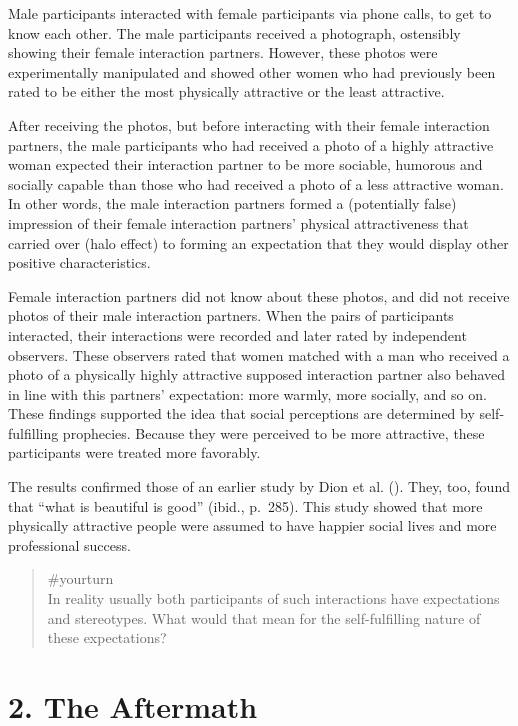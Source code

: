 \documentclass[
  letterpaper,
]{book}
\begin{document}
Male participants interacted with female participants via phone calls,
to get to know each other. The male participants received a photograph,
ostensibly showing their female interaction partners. However, these
photos were experimentally manipulated and showed other women who had
previously been rated to be either the most physically attractive or the
least attractive.

After receiving the photos, but before interacting with their female
interaction partners, the male participants who had received a photo of
a highly attractive woman expected their interaction partner to be more
sociable, humorous and socially capable than those who had received a
photo of a less attractive woman. In other words, the male interaction
partners formed a (potentially false) impression of their female
interaction partners' physical attractiveness that carried over (halo
effect) to forming an expectation that they would display other positive
characteristics.

Female interaction partners did not know about these photos, and did not
receive photos of their male interaction partners. When the pairs of
participants interacted, their interactions were recorded and later
rated by independent observers. These observers rated that women matched
with a man who received a photo of a physically highly attractive
supposed interaction partner also behaved in line with this partners'
expectation: more warmly, more socially, and so on. These findings
supported the idea that social perceptions are determined by
self-fulfilling prophecies. Because they were perceived to be more
attractive, these participants were treated more favorably.

The results confirmed those of an earlier study by Dion et al.
(). They, too, found that ``what is
beautiful is good'' (ibid., p.~285). This study showed that more
physically attractive people were assumed to have happier social lives
and more professional success.

\begin{quote}
{\#yourturn}\\
In reality usually both participants of such interactions have
expectations and stereotypes. What would that mean for the
self-fulfilling nature of these expectations?
\end{quote}

\section{2. The Aftermath}\label{the-aftermath-10}
\end{document}
